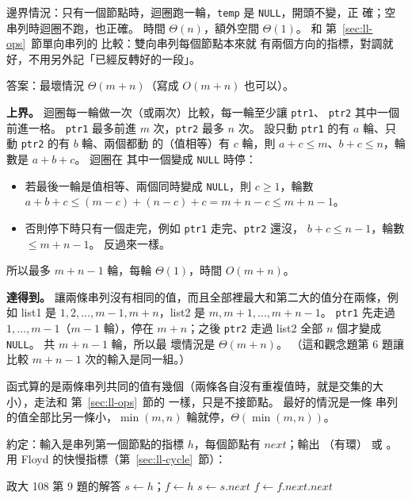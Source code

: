 邊界情況：只有一個節點時，迴圈跑一輪，\texttt{temp} 是 \texttt{NULL}，開頭不變，正
確；空串列時迴圈不跑，也正確。 時間 $\Theta(n)$，額外空間 $\Theta(1)$。 和
第~\ref{sec:ll-ops}~節單向串列的  比較：雙向串列每個節點本來就
有兩個方向的指標，對調就好，不用另外記「已經反轉好的一段」。

答案：最壞情況 $\Theta(m + n)$（寫成 $O(m + n)$ 也可以）。

\textbf{上界。} 迴圈每一輪做一次（或兩次）比較，每一輪至少讓 \texttt{ptr1}、
\texttt{ptr2} 其中一個前進一格。 \texttt{ptr1} 最多前進 $m$ 次，\texttt{ptr2} 最多
$n$ 次。 設只動 \texttt{ptr1} 的有 $a$ 輪、只動 \texttt{ptr2} 的有 $b$ 輪、兩個都動
的（值相等）有 $c$ 輪，則 $a + c \le m$、$b + c \le n$，輪數是 $a + b + c$。 迴圈在
其中一個變成 \texttt{NULL} 時停：
\begin{itemize}
\item 若最後一輪是值相等、兩個同時變成 \texttt{NULL}，則 $c \ge 1$，輪數
$a + b + c \le (m - c) + (n - c) + c = m + n - c \le m + n - 1$。
\item 否則停下時只有一個走完，例如 \texttt{ptr1} 走完、\texttt{ptr2} 還沒，
$b + c \le n - 1$，輪數 $\le m + n - 1$。 反過來一樣。
\end{itemize}
所以最多 $m + n - 1$ 輪，每輪 $\Theta(1)$，時間 $O(m + n)$。

\textbf{達得到。} 讓兩條串列沒有相同的值，而且全部裡最大和第二大的值分在兩條，例如
list1 是 $1, 2, \ldots, m - 1, m + n$，list2 是 $m, m + 1, \ldots, m + n - 1$。
\texttt{ptr1} 先走過 $1, \ldots, m - 1$（$m - 1$ 輪），停在 $m + n$；之後
\texttt{ptr2} 走過 list2 全部 $n$ 個才變成 \texttt{NULL}。 共 $m + n - 1$ 輪，所以最
壞情況是 $\Theta(m + n)$。 （這和觀念題第 6 題讓  比較 $m + n - 1$
次的輸入是同一組。）

函式算的是兩條串列共同的值有幾個（兩條各自沒有重複值時，就是交集的大小），走法和
第~\ref{sec:ll-ops}~節的  一樣，只是不接節點。 最好的情況是一條
串列的值全部比另一條小，$\min(m, n)$ 輪就停，$\Theta(\min(m, n))$。

約定：輸入是串列第一個節點的指標 $h$，每個節點有 $\mathit{next}$；輸出 \TRUE（有環）
或 \FALSE。 用 Floyd 的快慢指標（第~\ref{sec:ll-cycle}~節）：

\begin{pseudo}{政大 108 第 9 題的解答}
    \State $s \gets h$；$f \gets h$ 
        \State $s \gets s.\mathit{next}$ 
        \State $f \gets f.\mathit{next}.\mathit{next}$ 
            \State \Return \TRUE
        \EndIf
    \EndWhile
    \State \Return \FALSE
\EndFunction
\end{pseudo}


